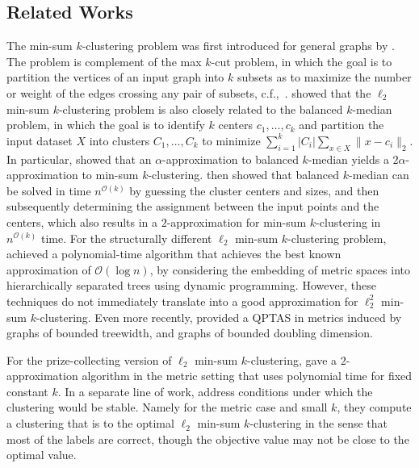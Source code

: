\documentclass[11pt]{article}
\newcommand{\seclab}[1]{\label{sec:#1}}
\renewcommand{\O}[1]{\ensuremath{\mathcal{O}\left(#1\right)}}
\begin{document}
\subsection{Related Works}
\seclab{sec:related}
The min-sum $k$-clustering problem was first introduced for general graphs by \cite{SahniG76}. 
The problem is complement of the max $k$-cut problem, in which the goal is to partition the vertices of an input graph into $k$ subsets as to maximize the number or weight of the edges crossing any pair of subsets, c.f.,~\cite{PapadimitriouY91}.  
\cite{Guttmann-BeckH98a} showed that the $\ell_2$ min-sum $k$-clustering problem is also closely related to the balanced $k$-median problem, in which the goal is to identify $k$ centers $c_1,\ldots,c_k$ and partition the input dataset $X$ into clusters $C_1,\ldots,C_k$ to minimize $\sum_{i=1}^k|C_i|\sum_{x\in X}\|x-c_i\|_2$.%
In particular, \cite{Guttmann-BeckH98a} showed that an $\alpha$-approximation to balanced $k$-median yields a $2\alpha$-approximation to min-sum $k$-clustering. 
\cite{Guttmann-BeckH98a} then showed that balanced $k$-median can be solved in time $n^{\O{k}}$ by guessing the cluster centers and sizes, and then subsequently determining the assignment between the input points and the centers, which also results in a $2$-approximation for min-sum $k$-clustering in $n^{\O{k}}$ time. 
For the structurally different $\ell_2$ min-sum $k$-clustering problem, \cite{BehsazFSS19} achieved a polynomial-time algorithm that achieves the best known approximation of $\O{\log n}$, by considering the embedding of metric spaces into hierarchically separated trees using dynamic programming. 
However, these techniques do not immediately translate into a good approximation for $\ell_2^2$ min-sum $k$-clustering. 
Even more recently, \cite{naderi2024approximation} provided a QPTAS in metrics induced by graphs of bounded treewidth, and graphs of bounded doubling dimension.

For the prize-collecting version of $\ell_2$ min-sum $k$-clustering, \cite{HassinO10} gave a $2$-approximation algorithm in the metric setting that uses polynomial time for fixed constant $k$. 
In a separate line of work, \cite{BalcanB09,BalcanBG09} address conditions under which the clustering would be stable. 
Namely for the metric case and small $k$, they compute a clustering that is to the optimal $\ell_2$ min-sum $k$-clustering in the sense that most of the labels are correct, though the objective value may not be close to the optimal value. 
\end{document}
